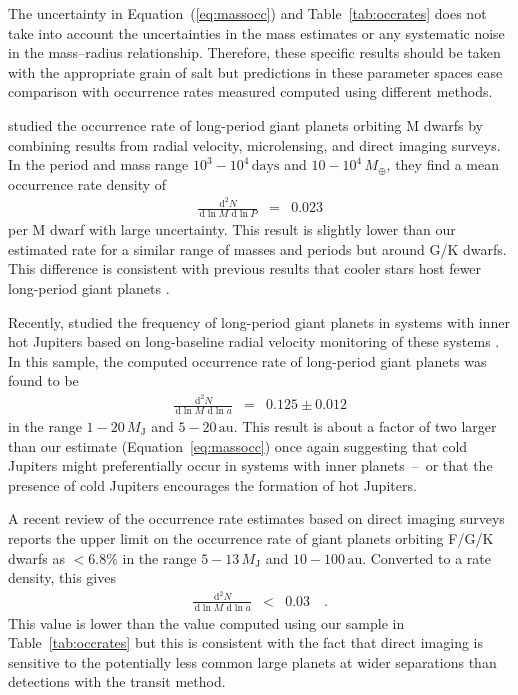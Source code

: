 \documentclass[manuscript, letterpaper]{aastex6}
\renewcommand{\eqref}[1]{\ref{eq:#1}}
\newcommand{\Eq}[1]{Equation~(\eqref{#1})}
\newcommand{\eq}[1]{\Eq{#1}}
\newcommand{\eqalt}[1]{Equation~\eqref{#1}}
\newcommand{\dd}{\ensuremath{\,\mathrm{d}}}
\newcommand{\unit}[1]{{\ensuremath{\,\mathrm{#1}}}}
\newcommand{\response}[1]{{\color{blue}#1}}
\begin{document}
The uncertainty in \eq{massocc} and Table~\ref{tab:occrates} does not take
into account the uncertainties in the mass estimates or any systematic noise
in the mass--radius relationship.
Therefore, these specific results should be taken with the appropriate grain
of salt but predictions in these parameter spaces ease comparison with
occurrence rates measured computed using different methods.

\response{%
\citet{Clanton:2016} studied the occurrence rate of long-period giant planets
orbiting M dwarfs by combining results from radial velocity, microlensing, and
direct imaging surveys.
In the period and mass range $10^3-10^4\unit{days}$ and $10-10^4\,M_\oplus$,
they find a mean occurrence rate density of
\begin{eqnarray}
\frac{\dd^2 N}{\dd\ln M\,\dd\ln P} &=& 0.023
\end{eqnarray}
per M dwarf with large uncertainty.}
This result is slightly lower than our estimated rate for a similar range of
masses and periods but around G/K dwarfs.
\response{%
This difference is consistent with previous results that cooler stars host
fewer long-period giant planets \citep[for example][]{Cumming:2008,
Clanton:2016}.
}

Recently, \citet{Bryan:2016} studied the frequency of long-period giant
planets in systems with inner hot Jupiters based on long-baseline radial
velocity monitoring of these systems \citep{Knutson:2014}.
In this sample, the computed occurrence rate of long-period giant planets was
found to be
\begin{eqnarray}
\frac{\dd^2 N}{\dd\ln M\,\dd\ln a} &=& 0.125 \pm 0.012
\end{eqnarray}
in the range $1-20\,M_\mathrm{J}$ and $5-20\unit{au}$.
This result is about a factor of two larger than our estimate
(\eqalt{massocc}) once again suggesting that cold Jupiters might
preferentially occur in systems with inner planets~--~or that the
presence of cold Jupiters encourages the formation of hot Jupiters.


A recent review of the occurrence rate estimates based on direct imaging
surveys \citep{Bowler:2016} reports the upper limit on the occurrence rate of
giant planets orbiting F/G/K dwarfs as $<6.8\%$ in the range
$5-13\,M_\mathrm{J}$ and $10-100\unit{au}$.
Converted to a rate density, this gives
\begin{eqnarray}
\frac{\dd^2 N}{\dd\ln M\,\dd\ln a} &<& 0.03 \quad.
\end{eqnarray} This value is lower than the value computed using our sample in
Table~\ref{tab:occrates} but this is consistent with the fact that direct
imaging is sensitive to the potentially less common large planets at wider
separations than detections with the transit method.
\end{document}
